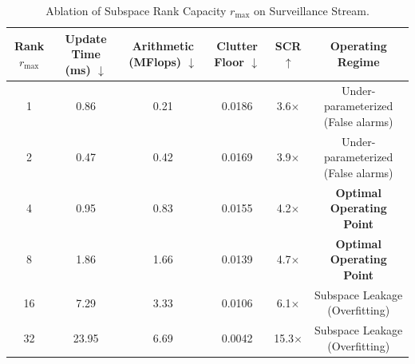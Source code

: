 \begin{table}[h]
\centering
\caption{Ablation of Subspace Rank Capacity $r_{\max}$ on Surveillance Stream.}
\label{tab:rank_sweep}
\begin{tabular}{cccccc}
\toprule
Rank $r_{\max}$ & Update Time (ms) $\downarrow$ & Arithmetic (MFlops) $\downarrow$ & Clutter Floor $\downarrow$ & SCR $\uparrow$ & Operating Regime \\
\midrule
 1 & 0.86 & 0.21 & 0.0186 & 3.6$\times$ & Under-parameterized (False alarms) \\
 2 & 0.47 & 0.42 & 0.0169 & 3.9$\times$ & Under-parameterized (False alarms) \\
 4 & 0.95 & 0.83 & 0.0155 & 4.2$\times$ & \textbf{Optimal Operating Point} \\
 8 & 1.86 & 1.66 & 0.0139 & 4.7$\times$ & \textbf{Optimal Operating Point} \\
16 & 7.29 & 3.33 & 0.0106 & 6.1$\times$ & Subspace Leakage (Overfitting) \\
32 & 23.95 & 6.69 & 0.0042 & 15.3$\times$ & Subspace Leakage (Overfitting) \\
\bottomrule
\end{tabular}
\end{table}
